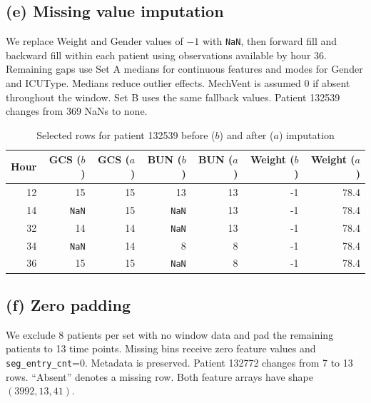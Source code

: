 \documentclass[11pt,a4paper]{article}
\begin{document}
\subsection*{(e) Missing value imputation}
We replace Weight and Gender values of $-1$ with \texttt{NaN}, then forward fill and backward fill
within each patient using observations available by hour 36.
Remaining gaps use Set A medians for continuous features and modes for Gender and ICUType.
Medians reduce outlier effects. MechVent is assumed 0 if absent throughout the window.
Set B uses the same fallback values. Patient 132539 changes from 369 NaNs to none.

\begin{table}[H]
\centering
\caption{Selected rows for patient 132539 before ($b$) and after ($a$) imputation}\label{tab:imputation}
\begin{tabular}{rrrrrrr}
\toprule
Hour & GCS ($b$) & GCS ($a$) & BUN ($b$) & BUN ($a$) & Weight ($b$) & Weight ($a$)\\
\midrule
12 & 15 & 15 & 13 & 13 & -1 & 78.4 \\
14 & \texttt{NaN} & 15 & \texttt{NaN} & 13 & -1 & 78.4 \\
32 & 14 & 14 & \texttt{NaN} & 13 & -1 & 78.4 \\
34 & \texttt{NaN} & 14 & 8 & 8 & -1 & 78.4 \\
36 & 15 & 15 & \texttt{NaN} & 8 & -1 & 78.4 \\
\bottomrule
\end{tabular}
\end{table}

\subsection*{(f) Zero padding}
We exclude 8 patients per set with no window data and pad the remaining patients to 13 time points.
Missing bins receive zero feature values and \texttt{seg\_entry\_cnt}=0. Metadata is preserved.
Patient 132772 changes from 7 to 13 rows. ``Absent'' denotes a missing row.
Both feature arrays have shape $(3992,13,41)$.
\end{document}
